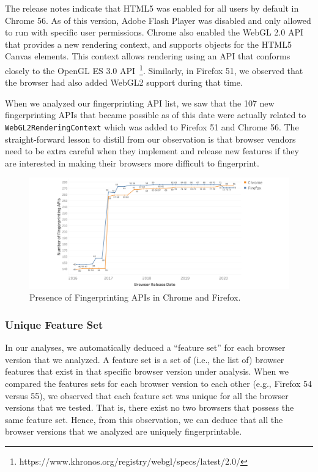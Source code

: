 The release notes indicate that HTML5 was enabled for all users by
default in Chrome 56. As of this version, Adobe Flash Player was
disabled and only allowed to run with specific user permissions.
Chrome also enabled the WebGL 2.0 API that provides a new rendering
context, and supports objects for the HTML5 Canvas elements. This
context allows rendering using an API that conforms closely to the
OpenGL ES 3.0
API~\footnote{https://www.khronos.org/registry/webgl/specs/latest/2.0/}.
Similarly, in Firefox 51, we observed that the browser had also added
WebGL2 support during that time.

When we analyzed our fingerprinting API list, we saw that the 107 new
fingerprinting APIs that became possible as of this date were actually
related to \texttt{WebGL2RenderingContext} which was added to Firefox
51 and Chrome 56. The straight-forward lesson to distill from our
observation is that browser vendors need to be extra careful when they
implement and release new features if they are interested in making
their browsers more difficult to fingerprint.

\begin{figure}[ht]
    \centering
    \includegraphics[width=\columnwidth]{figures/Fingerprinting-APIs.png}
    \caption{Presence of Fingerprinting APIs in Chrome and Firefox.}
    \label{fig:fingerprint-apis}
\end{figure}

\subsubsection{Unique Feature Set}

In our analyses, we automatically deduced a ``feature set'' for each
browser version that we analyzed. A feature set is a set of (i.e., the
list of) browser features that exist in that specific browser version
under analysis. When we compared the features sets for each browser
version to each other (e.g., Firefox 54 versus 55), we observed that
each feature set was unique for all the browser versions that we
tested. That is, there exist no two browsers that possess the same
feature set. Hence, from this observation, we can deduce that all the
browser versions that we analyzed are uniquely fingerprintable.

